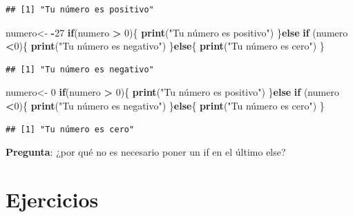 \documentclass[
]{book}
\newenvironment{Shaded}{\begin{snugshade}}{\end{snugshade}}
\newcommand{\ControlFlowTok}[1]{\textcolor[rgb]{0.13,0.29,0.53}{\textbf{#1}}}
\newcommand{\DecValTok}[1]{\textcolor[rgb]{0.00,0.00,0.81}{#1}}
\newcommand{\FunctionTok}[1]{\textcolor[rgb]{0.13,0.29,0.53}{\textbf{#1}}}
\newcommand{\NormalTok}[1]{#1}
\newcommand{\OtherTok}[1]{\textcolor[rgb]{0.56,0.35,0.01}{#1}}
\newcommand{\SpecialCharTok}[1]{\textcolor[rgb]{0.81,0.36,0.00}{\textbf{#1}}}
\newcommand{\StringTok}[1]{\textcolor[rgb]{0.31,0.60,0.02}{#1}}
\begin{document}
\begin{verbatim}
## [1] "Tu número es positivo"
\end{verbatim}

\begin{Shaded}
\begin{Highlighting}[]
\NormalTok{numero}\OtherTok{\textless{}{-}} \SpecialCharTok{{-}}\DecValTok{27}
\ControlFlowTok{if}\NormalTok{(numero }\SpecialCharTok{\textgreater{}} \DecValTok{0}\NormalTok{)\{}
  \FunctionTok{print}\NormalTok{(}\StringTok{"Tu número es positivo"}\NormalTok{)}
\NormalTok{\}}\ControlFlowTok{else} \ControlFlowTok{if}\NormalTok{ (numero }\SpecialCharTok{\textless{}}\DecValTok{0}\NormalTok{)\{}
  \FunctionTok{print}\NormalTok{(}\StringTok{"Tu número es negativo"}\NormalTok{)}
\NormalTok{\}}\ControlFlowTok{else}\NormalTok{\{}
  \FunctionTok{print}\NormalTok{(}\StringTok{"Tu número es cero"}\NormalTok{)}
\NormalTok{\}}
\end{Highlighting}
\end{Shaded}

\begin{verbatim}
## [1] "Tu número es negativo"
\end{verbatim}

\begin{Shaded}
\begin{Highlighting}[]
\NormalTok{numero}\OtherTok{\textless{}{-}} \DecValTok{0}
\ControlFlowTok{if}\NormalTok{(numero }\SpecialCharTok{\textgreater{}} \DecValTok{0}\NormalTok{)\{}
  \FunctionTok{print}\NormalTok{(}\StringTok{"Tu número es positivo"}\NormalTok{)}
\NormalTok{\}}\ControlFlowTok{else} \ControlFlowTok{if}\NormalTok{ (numero }\SpecialCharTok{\textless{}}\DecValTok{0}\NormalTok{)\{}
  \FunctionTok{print}\NormalTok{(}\StringTok{"Tu número es negativo"}\NormalTok{)}
\NormalTok{\}}\ControlFlowTok{else}\NormalTok{\{}
  \FunctionTok{print}\NormalTok{(}\StringTok{"Tu número es cero"}\NormalTok{)}
\NormalTok{\}}
\end{Highlighting}
\end{Shaded}

\begin{verbatim}
## [1] "Tu número es cero"
\end{verbatim}

\textbf{Pregunta}: ¿por qué no es necesario poner un if en el último else?

\hypertarget{ejercicios-2}{%
\section{Ejercicios}\label{ejercicios-2}}
\end{document}
